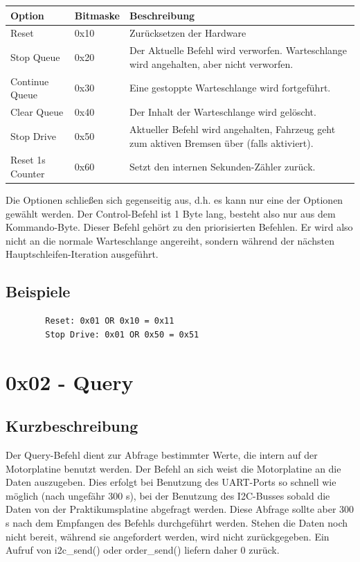 \documentclass[a4paper]{article}
\begin{document}
	\begin{tabularx}{\linewidth}{|l|l|X|}
		\hline
		\textbf{Option} & \textbf{Bitmaske} & \textbf{Beschreibung} \\
		\hline
		\hline
		Reset 			& 0x10 				& Zurücksetzen der Hardware \\
		\hline
		Stop Queue		& 0x20				& Der Aktuelle Befehl wird verworfen. Warteschlange wird angehalten, aber nicht verworfen. \\
		\hline
		Continue Queue	& 0x30				& Eine gestoppte Warteschlange wird fortgeführt. \\
		\hline
		Clear Queue		& 0x40				& Der Inhalt der Warteschlange wird gelöscht. \\
		\hline
		Stop Drive		& 0x50				& Aktueller Befehl wird angehalten, Fahrzeug geht zum aktiven Bremsen über (falls aktiviert). \\
		\hline
		Reset 1s Counter& 0x60				& Setzt den internen Sekunden-Zähler zurück. \\
		\hline
	\end{tabularx}

	Die Optionen schließen sich gegenseitig aus, d.h. es kann nur eine der
	Optionen gewählt werden. Der Control-Befehl ist 1 Byte lang, besteht also
	nur aus dem Kommando-Byte. Dieser Befehl gehört zu den priorisierten
	Befehlen. Er wird also nicht an die normale Warteschlange angereiht,
	sondern während der nächsten Hauptschleifen-Iteration ausgeführt.


	\subsection{Beispiele}
	
	\begin{verbatim}
		Reset: 0x01 OR 0x10 = 0x11
		Stop Drive: 0x01 OR 0x50 = 0x51
	\end{verbatim}
	
	\pagebreak

	\section{0x02 - Query}

	\subsection{Kurzbeschreibung}

	Der Query-Befehl dient zur Abfrage bestimmter Werte, die intern auf der
	Motorplatine benutzt werden. Der Befehl an sich weist die Motorplatine
	an die Daten auszugeben. Dies erfolgt bei Benutzung des UART-Ports so
	schnell wie möglich (nach ungefähr 300 \textmu{}s), bei der Benutzung
	des I2C-Busses sobald die Daten von der Praktikumsplatine abgefragt
	werden. Diese Abfrage sollte aber 300 \textmu{}s nach dem Empfangen
	des Befehls durchgeführt werden. Stehen die Daten noch nicht bereit,
	während sie angefordert werden, wird nicht zurückgegeben. Ein Aufruf
	von i2c\_send() oder order\_send() liefern daher 0 zurück.
\end{document}
